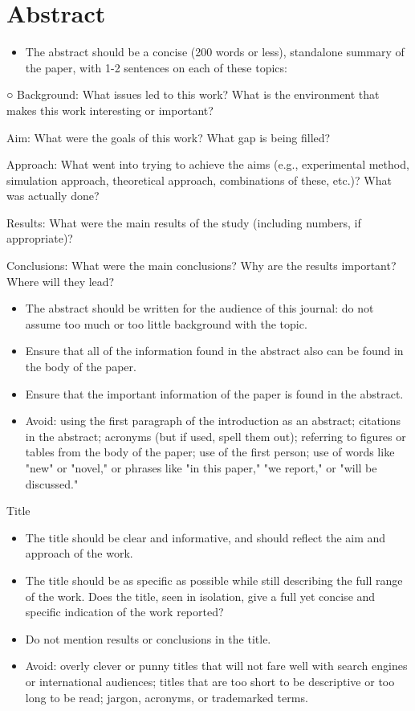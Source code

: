 \section*{Abstract}
\begin{itemize}
  \item The abstract should be a concise (200 words or less), standalone summary of the paper, with 1-2 sentences on each of these topics:
\end{itemize}

○ Background: What issues led to this work? What is the environment that makes this work interesting or important?

Aim: What were the goals of this work? What gap is being filled?

Approach: What went into trying to achieve the aims (e.g., experimental method, simulation approach, theoretical approach, combinations of these, etc.)? What was actually done?

Results: What were the main results of the study (including numbers, if appropriate)?

Conclusions: What were the main conclusions? Why are the results important? Where will they lead?

\begin{itemize}
  \item The abstract should be written for the audience of this journal: do not assume too much or too little background with the topic.
  \item Ensure that all of the information found in the abstract also can be found in the body of the paper.
  \item Ensure that the important information of the paper is found in the abstract.
  \item Avoid: using the first paragraph of the introduction as an abstract; citations in the abstract; acronyms (but if used, spell them out); referring to figures or tables from the body of the paper; use of the first person; use of words like "new" or "novel," or phrases like "in this paper," "we report," or "will be discussed."
\end{itemize}

Title

\begin{itemize}
  \item The title should be clear and informative, and should reflect the aim and approach of the work.
  \item The title should be as specific as possible while still describing the full range of the work. Does the title, seen in isolation, give a full yet concise and specific indication of the work reported?
  \item Do not mention results or conclusions in the title.
  \item Avoid: overly clever or punny titles that will not fare well with search engines or international audiences; titles that are too short to be descriptive or too long to be read; jargon, acronyms, or trademarked terms.
\end{itemize}
